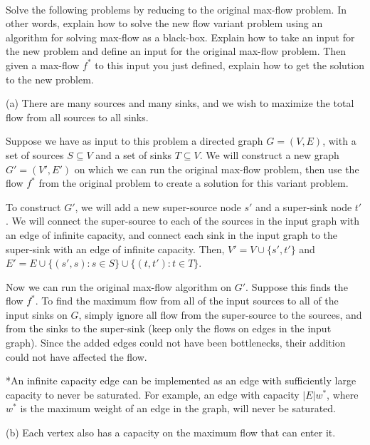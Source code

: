 \documentclass[12pt]{amsart}
\theoremstyle{plain}
\theoremstyle{definition}
\theoremstyle{remark}
\begin{document}
	\thispagestyle{fancy}
	\pagestyle{plain}


	  \\

	Solve the following problems by reducing to the original max-flow problem.
	In other words, explain how to solve the
new flow variant problem using an algorithm for solving max-flow as a black-box.
	Explain how to take an input for the new problem and define an input for the original max-flow problem.  Then given a max-flow $f^*$ to this input you just defined, explain how to get the solution to the new problem.


	
	(a) There are many sources and many sinks, and we wish to maximize the total flow from all sources to all sinks.
	
	\begin{tcolorbox}
		Suppose we have as input to this problem a directed graph $G = (V,E)$, with a set of sources $S \subseteq V$ and a set of sinks $T \subseteq V$.  We will construct a new graph $G' = (V', E')$ on which we can run the original max-flow problem, then use the flow $f^*$ from the original problem to create a solution for this variant problem.
		
		To construct $G'$, we will add a new super-source node $s'$ and a super-sink node $t'$.  We will connect the super-source to each of the sources in the input graph with an edge of infinite capacity, and connect each sink in the input graph to the super-sink with an edge of infinite capacity.  Then, $V' = V \cup \{s',t'\}$ and $E' = E \cup \{(s',s) : s \in S\} \cup \{(t,t') : t \in T\}$.
		
		Now we can run the original max-flow algorithm on $G'$.  Suppose this finds the flow $f^*$.  To find the maximum flow from all of the input sources to all of the input sinks on $G$, simply ignore all flow from the super-source to the sources, and from the sinks to the super-sink  (keep only the flows on edges in the input graph).  Since the added edges could not have been bottlenecks, their addition could not have affected the flow.
		
		*An infinite capacity edge can be implemented as an edge with sufficiently large capacity to never be saturated.  For example, an edge with capacity $|E|w^*$, where $w^*$ is the maximum weight of an edge in the graph, will never be saturated.
	\end{tcolorbox}
	
	\newpage
	(b) Each vertex also has a capacity on the maximum flow that can enter it.
	
\end{document}
